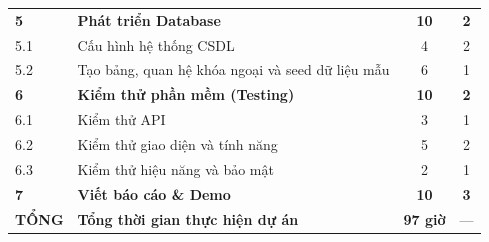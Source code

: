 \begin{table}[h]
\begin{tabularx}{\textwidth}{l X c c}
\addlinespace
\textbf{5} & \textbf{Phát triển Database} & \textbf{10} & \textbf{2} \\
5.1 & Cấu hình hệ thống CSDL & 4 & 2 \\
5.2 & Tạo bảng, quan hệ khóa ngoại và seed dữ liệu mẫu & 6 & 1 \\
\addlinespace
\textbf{6} & \textbf{Kiểm thử phần mềm (Testing)} & \textbf{10} & \textbf{2} \\
6.1 & Kiểm thử API  & 3 & 1 \\
6.2 & Kiểm thử giao diện và tính năng & 5 & 2 \\
6.3 & Kiểm thử hiệu năng và bảo mật & 2 & 1 \\
\addlinespace
\textbf{7} & \textbf{Viết báo cáo \& Demo} & \textbf{10} & \textbf{3} \\
\midrule
\textbf{TỔNG} & \textbf{Tổng thời gian thực hiện dự án} & \textbf{97 giờ} & — \\
\bottomrule
\end{tabularx}
\end{table}